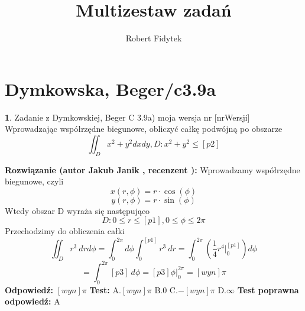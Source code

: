 \documentclass[12pt, a4paper]{article}
\title{Multizestaw zadań}
\author{Robert Fidytek}
\date{}
\theoremstyle{definition} %
\newtheorem{zad}{}
\newcommand{\kategoria}[1]{\section{#1}} %
\newcommand{\zadStart}[1]{\begin{zad}#1\newline} %
\newcommand{\zadStop}{\end{zad}}   %
\newcommand{\rozwStart}[2]{\noindent \textbf{Rozwiązanie (autor #1 , recenzent #2): }\newline} %
\newcommand{\rozwStop}{\newline}                                            %
\newcommand{\odpStart}{\noindent \textbf{Odpowiedź:}\newline}    %
\newcommand{\odpStop}{\newline}                                             %
\newcommand{\testStart}{\noindent \textbf{Test:}\newline} %
\newcommand{\testStop}{\newline} %
\newcommand{\kluczStart}{\noindent \textbf{Test poprawna odpowiedź:}\newline} %
\newcommand{\kluczStop}{\newline} %
\begin{document}
\maketitle


\kategoria{Dymkowska, Beger/c3.9a}
\zadStart{Zadanie z Dymkowskiej, Beger C 3.9a) moja wersja nr [nrWersji]}
Wprowadzając współrzędne biegunowe, obliczyć całkę podwójną po obszarze $$\iint_D x^2+y^2 dxdy, D: x^2+y^2 \leq [p2]$$
\zadStop
\rozwStart{Jakub Janik}{}
Wprowadzamy współrzędne biegunowe, czyli $$x(r,\phi)=r\cdot\cos{(\phi)}$$
$$y(r,\phi)=r\cdot\sin{(\phi)}$$
Wtedy obszar D wyraża się następująco $$D: 0 \leq r \leq [p1], 0 \leq \phi \leq 2\pi$$
Przechodzimy do obliczenia całki
$$\iint_D r^3\ drd\phi = \int_0^{2\pi}d\phi\int_0^{[p1]}r^3\ dr=\int_0^{2\pi}(\frac{1}{4}r^4\Big|_0^{[p1]})d\phi$$
$$=\int_0^{2\pi}[p3]\ d\phi=[p3]\phi\Big|_0^{2\pi}=[wyn]\pi$$
\rozwStop
\odpStart
$[wyn]\pi$
\odpStop
\testStart
A.$[wyn]\pi$
B.$0$
C.$-[wyn]\pi$
D.$\infty$
\testStop
\kluczStart
A
\kluczStop
\end{document}
